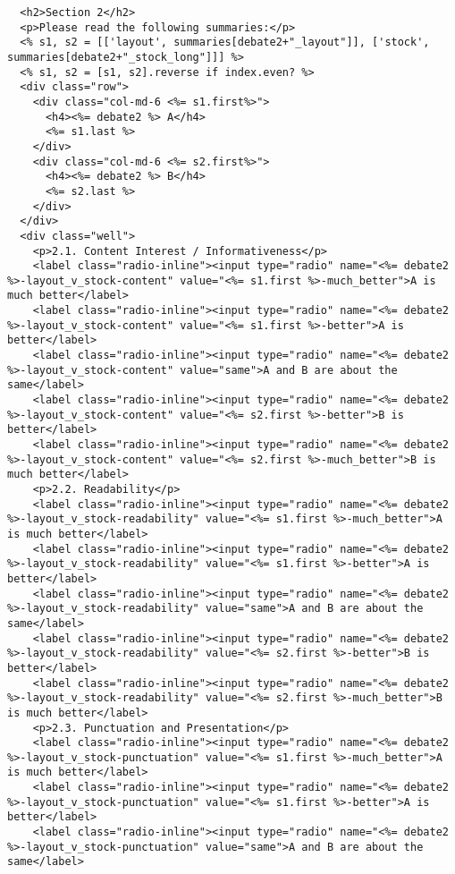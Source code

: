 \documentclass{article}
\begin{document}
\begin{verbatim}
  <h2>Section 2</h2>
  <p>Please read the following summaries:</p>
  <% s1, s2 = [['layout', summaries[debate2+"_layout"]], ['stock', summaries[debate2+"_stock_long"]]] %>
  <% s1, s2 = [s1, s2].reverse if index.even? %>
  <div class="row">
    <div class="col-md-6 <%= s1.first%>">
      <h4><%= debate2 %> A</h4>
      <%= s1.last %>
    </div>
    <div class="col-md-6 <%= s2.first%>">
      <h4><%= debate2 %> B</h4>
      <%= s2.last %>
    </div>
  </div>
  <div class="well">
    <p>2.1. Content Interest / Informativeness</p>
    <label class="radio-inline"><input type="radio" name="<%= debate2 %>-layout_v_stock-content" value="<%= s1.first %>-much_better">A is much better</label>
    <label class="radio-inline"><input type="radio" name="<%= debate2 %>-layout_v_stock-content" value="<%= s1.first %>-better">A is better</label>
    <label class="radio-inline"><input type="radio" name="<%= debate2 %>-layout_v_stock-content" value="same">A and B are about the same</label>
    <label class="radio-inline"><input type="radio" name="<%= debate2 %>-layout_v_stock-content" value="<%= s2.first %>-better">B is better</label>
    <label class="radio-inline"><input type="radio" name="<%= debate2 %>-layout_v_stock-content" value="<%= s2.first %>-much_better">B is much better</label>
    <p>2.2. Readability</p>
    <label class="radio-inline"><input type="radio" name="<%= debate2 %>-layout_v_stock-readability" value="<%= s1.first %>-much_better">A is much better</label>
    <label class="radio-inline"><input type="radio" name="<%= debate2 %>-layout_v_stock-readability" value="<%= s1.first %>-better">A is better</label>
    <label class="radio-inline"><input type="radio" name="<%= debate2 %>-layout_v_stock-readability" value="same">A and B are about the same</label>
    <label class="radio-inline"><input type="radio" name="<%= debate2 %>-layout_v_stock-readability" value="<%= s2.first %>-better">B is better</label>
    <label class="radio-inline"><input type="radio" name="<%= debate2 %>-layout_v_stock-readability" value="<%= s2.first %>-much_better">B is much better</label>
    <p>2.3. Punctuation and Presentation</p>
    <label class="radio-inline"><input type="radio" name="<%= debate2 %>-layout_v_stock-punctuation" value="<%= s1.first %>-much_better">A is much better</label>
    <label class="radio-inline"><input type="radio" name="<%= debate2 %>-layout_v_stock-punctuation" value="<%= s1.first %>-better">A is better</label>
    <label class="radio-inline"><input type="radio" name="<%= debate2 %>-layout_v_stock-punctuation" value="same">A and B are about the same</label>

\end{verbatim}
\end{document}
